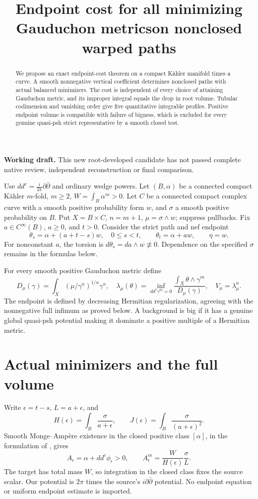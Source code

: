 \documentclass[11pt]{article}
\title{Endpoint cost for all minimizing Gauduchon metrics\newline on nonclosed warped paths}
\author{}\date{}
\newcommand{\ddc}{dd^c}
\theoremstyle{remark}\newtheorem{remark}[theorem]{Remark}
\begin{document}
\maketitle
\noindent\textbf{Working draft.} This new root-developed candidate has not
passed complete native review, independent reconstruction or final comparison.
\begin{abstract}
We propose an exact endpoint-cost theorem on a compact K\"ahler manifold
times a curve. A smooth nonnegative vertical coefficient determines
nonclosed paths with actual balanced minimizers. The cost is independent
of every choice of attaining Gauduchon metric, and its improper integral
equals the drop in root volume. Tubular codimension and vanishing order
give five quantitative integrable profiles. Positive endpoint volume is
compatible with failure of bigness, which is excluded for every genuine
quasi-psh strict representative by a smooth closed test.
\end{abstract}

Use $\ddc=\frac{i}{2\pi}\partial\bar\partial$ and ordinary wedge powers.
Let $(B,\alpha)$ be a connected compact K\"ahler $m$-fold, $m\geq2$,
$W=\int_B\alpha^m>0$. Let $C$ be a connected compact complex curve
with a smooth positive probability form $w$, and $\sigma$ a smooth
positive probability on $B$. Put $X=B\times C$, $n=m+1$,
$\mu=\sigma\wedge w$; suppress pullbacks. Fix $a\in C^\infty(B)$,
$a\geq0$, and $t>0$.
Consider the strict path and nef endpoint
\[
 \theta_s=\alpha+(a+t-s)w,\quad 0\leq s<t,
 \qquad\theta_t=\alpha+aw,\qquad\eta=w.
\]
For nonconstant $a$, the torsion is $d\theta_s=da\wedge w\not\equiv0$.
Dependence on the specified $\sigma$ remains in the formulas below.

For every smooth positive Gauduchon metric define
\[
 D_\mu(\gamma)=\int_X(\mu/\gamma^n)^{1/n}\gamma^n,
 \quad\lambda_\mu(\theta)=
 \inf_{\ddc\gamma^m=0}\frac{\int_X\theta\wedge\gamma^m}{D_\mu(\gamma)},
 \quad V_\mu=\lambda_\mu^n.
\]
The endpoint is defined by decreasing Hermitian regularization, agreeing
with the nonnegative full infimum as proved below. A background is big
if it has a genuine global quasi-psh potential making it dominate a
positive multiple of a Hermitian metric.

\section{Actual minimizers and the full volume}
Write $\epsilon=t-s$, $L=a+\epsilon$, and
\[
 H(\epsilon)=\int_B\frac{\sigma}{a+\epsilon},\qquad
 J(\epsilon)=\int_B\frac{\sigma}{(a+\epsilon)^2}.
\]
Smooth Monge--Amp\`ere existence in the closed positive class
$[\alpha]$, in the formulation of \cite[Corollary 1]{TW}, gives
\[
 A_\epsilon=\alpha+\ddc\phi_\epsilon>0,\qquad
 A_\epsilon^m=\frac{W}{H(\epsilon)}\frac{\sigma}{L}.
\]
The target has total mass $W$, so integration in the closed class fixes
the source scalar. Our potential is $2\pi$ times the source's
$i\partial\bar\partial$ potential. No endpoint equation or uniform
endpoint estimate is imported.
\end{document}

